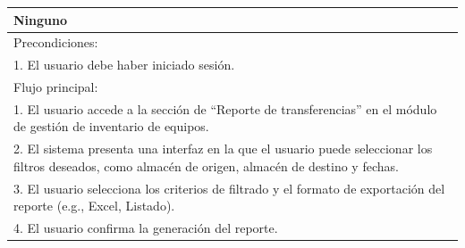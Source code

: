 \documentclass[stu, 12pt, letterpaper, donotrepeattitle, floatsintext, natbib]{apa7}
\begin{document}
\begin{longtable}{@{} p{16.5cm} @{}}
    Ninguno                                                                                                                                                                                                                                                                             \\ \midrule
    Precondiciones:                                                                                                                                                                                                                                                                     \\
    1. El usuario debe haber iniciado sesi\'on.                                                                                                                                                                                                                                         \\ \midrule
    Flujo principal:                                                                                                                                                                                                                                                                    \\
    1. El usuario accede a la secci\'on de ``Reporte de transferencias'' en el m\'odulo de gesti\'on de inventario de equipos.                                                                                                                                                          \\
    2. El sistema presenta una interfaz en la que el usuario puede seleccionar los filtros deseados, como almac\'en de origen, almac\'en de destino y fechas.                                                                                                                           \\
    3. El usuario selecciona los criterios de filtrado y el formato de exportaci\'on del reporte (e.g., Excel, Listado).                                                                                                                                                                \\
    4. El usuario confirma la generaci\'on del reporte.                                                                                                                                                                                                                                 \\

\end{longtable}
\end{document}
